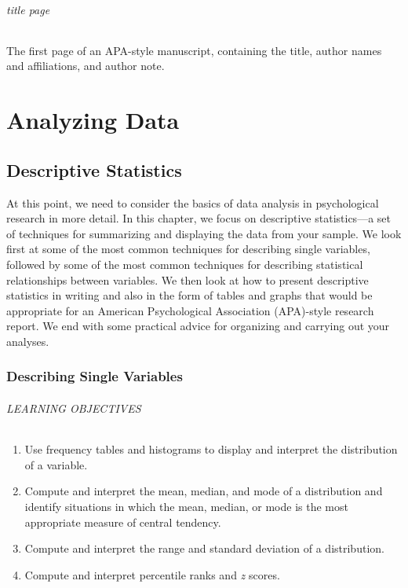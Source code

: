 \documentclass[
]{krantz}
\providecommand{\tightlist}{%
  \setlength{\itemsep}{0pt}\setlength{\parskip}{0pt}}
\begin{document}
\hypertarget{title-page}{%
\paragraph*{title page}\label{title-page}}

The first page of an APA-style manuscript, containing the title, author names and affiliations, and author note.

\hypertarget{part-analyzing-data}{%
\part*{Analyzing Data}\label{part-analyzing-data}}


\hypertarget{descriptive-statistics}{%
\chapter{Descriptive Statistics}\label{descriptive-statistics}}

At this point, we need to consider the basics of data analysis in psychological research in more detail. In this chapter, we focus on descriptive statistics---a set of techniques for summarizing and displaying the data from your sample. We look first at some of the most common techniques for describing single variables, followed by some of the most common techniques for describing statistical relationships between variables. We then look at how to present descriptive statistics in writing and also in the form of tables and graphs that would be appropriate for an American Psychological Association (APA)-style research report. We end with some practical advice for organizing and carrying out your analyses.

\hypertarget{describing-single-variables}{%
\section{Describing Single Variables}\label{describing-single-variables}}

\hypertarget{learning-objectives-35}{%
\paragraph*{LEARNING OBJECTIVES}\label{learning-objectives-35}}

\begin{enumerate}
\def\labelenumi{\arabic{enumi}.}
\tightlist
\item
  Use frequency tables and histograms to display and interpret the distribution of a variable.
\item
  Compute and interpret the mean, median, and mode of a distribution and identify situations in which the mean, median, or mode is the most appropriate measure of central tendency.
\item
  Compute and interpret the range and standard deviation of a distribution.
\item
  Compute and interpret percentile ranks and \emph{z} scores.
\end{enumerate}
\end{document}
